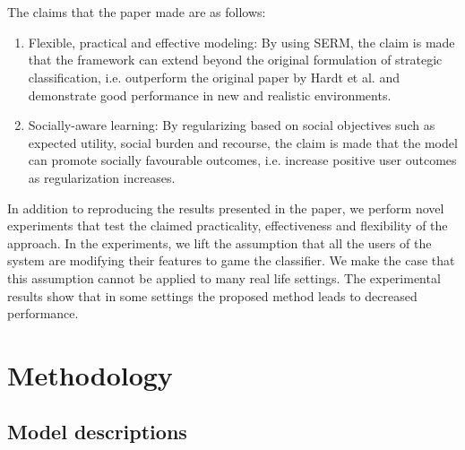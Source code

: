 \\\\
The claims that the paper made are as follows:
\begin{enumerate}
    \item Flexible, practical and effective modeling: By using SERM, the claim is made that the framework can extend beyond the original formulation of strategic classification, i.e. outperform the original paper by Hardt et al.\cite{hardt2016strategic} and demonstrate good performance in new and realistic environments.
    \item Socially-aware learning: By regularizing based on social objectives such as expected utility, social burden and recourse, the claim is made that the model can promote socially favourable outcomes, i.e. increase positive user outcomes as regularization increases.
\end{enumerate}

In addition to reproducing the results presented in the paper, we perform novel experiments that test the claimed practicality, effectiveness and flexibility of the approach. In the experiments, we lift the assumption that all the users of the system are modifying their features to game the classifier. We make the case that this assumption cannot be applied to many real life settings. The experimental results show that in some settings the proposed method leads to decreased performance.


\section{Methodology}

\subsection{Model descriptions} \label{sec:model_desc}


